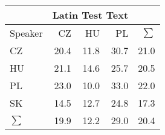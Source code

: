 \begin{tabular}{l|rrr|r}
\hline
 & \multicolumn{3}{c}{Latin Test Text} & \\
\hline
 Speaker   &   CZ &   HU &   PL &   $\sum$ \\
\hline
 CZ        & 20.4 & 11.8 & 30.7 &     21.0 \\
 HU        & 21.1 & 14.6 & 25.7 &     20.5 \\
 PL        & 23.0 & 10.0 & 33.0 &     22.0 \\
 SK        & 14.5 & 12.7 & 24.8 &     17.3 \\
\hline
 $\sum$   & 19.9 & 12.2 & 29.0 &     20.4 \\
\hline
\end{tabular}